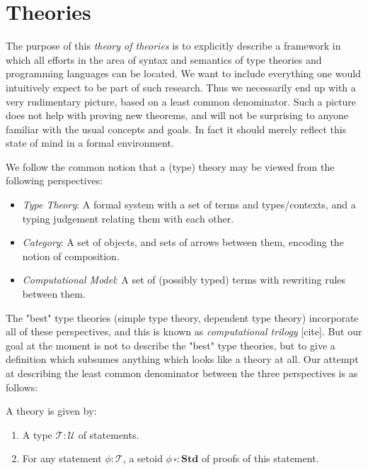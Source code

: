 \documentclass[11pt]{article}
\date{\today}
\title{}
\begin{document}
\tableofcontents

\section{Theories}
\label{sec:orgcecb208}

The purpose of this \emph{theory of theories} is to explicitly describe a framework in
which all efforts in the area of syntax and semantics of type theories and programming languages
can be located. We want to include everything one would intuitively expect to be part of such research.
Thus we necessarily end up with a very rudimentary picture, based on a least common denominator.
Such a picture does not help with proving new theorems, and will not be surprising to anyone familiar
with the usual concepts and goals. In fact it should merely reflect this state of mind in a formal environment.

We follow the common notion that a (type) theory may be viewed from the following perspectives:
\begin{itemize}
\item \emph{Type Theory}: A formal system with a set of terms and types/contexts, and a typing judgement relating them with each other.
\item \emph{Category}: A set of objects, and sets of arrows between them, encoding the notion of composition.
\item \emph{Computational Model}: A set of (possibly typed) terms with rewriting rules between them.
\end{itemize}

The "best" type theories (simple type theory, dependent type theory) incorporate all of these perspectives,
and this is known as \emph{computational trilogy} [cite]. But our goal at the moment is not to describe the "best" type theories,
but to give a definition which subsumes anything which looks like a theory at all. Our attempt at describing the least common denominator
between the three perspectives is as follows:

\begin{definition}
  A theory is given by:
  \begin{enumerate}
    \item A type $\mathscr{T} : \mathscr{U}$ of statements.
    \item For any statement $\phi : \mathscr{T}$, a setoid $\phi\,\square : \mathbf{Std}$ of proofs of this statement.
  \end{enumerate}
\end{definition}
\end{document}
